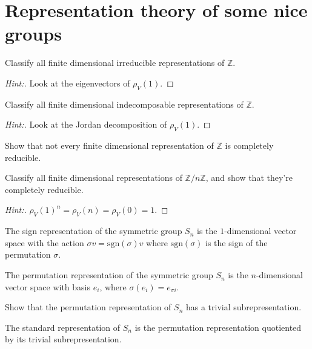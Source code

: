 \documentclass[11pt]{article}
\begin{document}
\section{Representation theory of some nice groups}

\begin{exercise}
Classify all finite dimensional irreducible representations of $\mathbb{Z}$.
\end{exercise}
\begin{proof}[Hint:]
Look at the eigenvectors of $\rho_V(1)$.
\end{proof}

\begin{exercise}
Classify all finite dimensional indecomposable representations of $\mathbb{Z}$.
\end{exercise}
\begin{proof}[Hint:]
Look at the Jordan decomposition of $\rho_V(1)$.
\end{proof}

\begin{exercise}
Show that not every finite dimensional representation of $\mathbb{Z}$ is completely reducible.
\end{exercise}

\begin{exercise}
Classify all finite dimensional representations of $\mathbb{Z}/n \mathbb{Z}$, and show that they're completely reducible.
\end{exercise}
\begin{proof}[Hint:]
$\rho_V(1)^n = \rho_V(n) = \rho_V(0) = 1$.
\end{proof}

\begin{definition}
The sign representation of the symmetric group $S_n$ is the $1$-dimensional vector space with the action $\sigma v = \mathrm{sgn}(\sigma) v$ where $\mathrm{sgn}(\sigma)$ is the sign of the permutation $\sigma$.

The permutation representation of the symmetric group $S_n$ is the $n$-dimensional vector space with basis $e_i$, where $\sigma(e_i) = e_{\sigma i}$.
\end{definition}

\begin{exercise}
Show that the permutation representation of $S_n$ has a trivial subrepresentation.
\end{exercise}

\begin{definition}
The standard representation of $S_n$ is the permutation representation quotiented by its trivial subrepresentation.
\end{definition}
\end{document}
